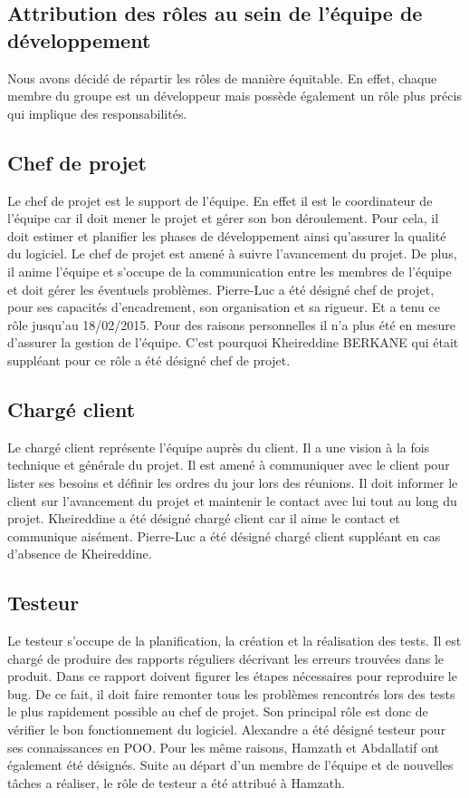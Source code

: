 \documentclass{../res/univ-projet}
\begin{document}
  \subsection{Attribution des rôles au sein de l’équipe de développement}
    Nous avons décidé de répartir les rôles de manière équitable. En effet, chaque membre du groupe est un développeur mais possède également un rôle plus précis qui implique des responsabilités.
  \subsection{Chef de projet}
    Le chef de projet est le support de l’équipe. En effet il est le coordinateur de l’équipe car il doit mener le projet et gérer son bon déroulement. Pour cela, il doit estimer et planifier les phases de développement ainsi qu’assurer la qualité du logiciel. Le chef de projet est amené à suivre l’avancement du projet. De plus, il anime l’équipe et s’occupe de la communication entre les membres de l’équipe et doit gérer les éventuels problèmes. Pierre-Luc a été désigné chef de projet, pour ses capacités d’encadrement, son organisation et sa rigueur. Et a tenu ce rôle jusqu'au 18/02/2015. Pour des raisons personnelles il n'a plus été en mesure d'assurer la gestion de l'équipe. C'est pourquoi Kheireddine BERKANE qui était suppléant pour ce rôle a été désigné chef de projet.
  \subsection{Chargé client}
    Le chargé client représente l’équipe auprès du client. Il a une vision à la fois technique et générale du projet. Il est amené à communiquer avec le client pour lister ses besoins et définir les ordres du jour lors des réunions. Il doit informer le client sur l’avancement du projet et maintenir le contact avec lui tout au long du projet.
    Kheireddine a été désigné chargé client car il aime le contact et communique aisément. Pierre-Luc a été désigné chargé client suppléant en cas d’absence de Kheireddine.
  \subsection{Testeur}
    Le testeur s’occupe de la planification, la création et la réalisation des tests. Il est chargé de produire des rapports réguliers décrivant les erreurs trouvées dans le produit. Dans ce rapport doivent figurer les étapes nécessaires pour reproduire le bug. De ce fait, il doit faire remonter tous les problèmes rencontrés lors des tests le plus rapidement possible au chef de projet. Son principal rôle est donc de vérifier le bon fonctionnement du logiciel. Alexandre a été désigné testeur pour ses connaissances en POO. Pour les même raisons, Hamzath et Abdallatif ont également été désignés. Suite au départ d'un membre de l'équipe et de nouvelles tâches a réaliser, le rôle de testeur a été attribué à Hamzath.
\end{document}
